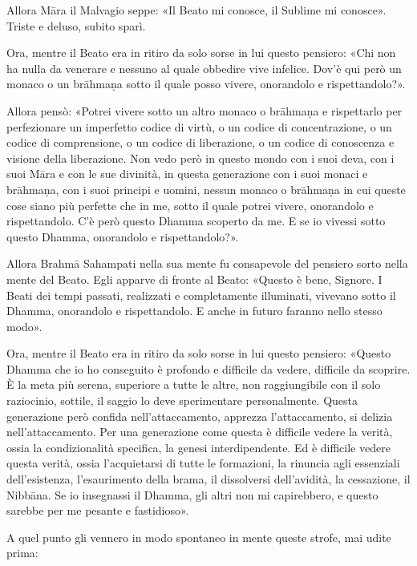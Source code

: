 Allora Māra il Malvagio seppe: «Il Beato mi conosce, il Sublime mi conosce».
Triste e deluso, subito sparì.


Ora, mentre il Beato era in ritiro da solo sorse in lui questo pensiero: «Chi
non ha nulla da venerare e nessuno al quale obbedire vive infelice. Dov’è qui
però un monaco o un brāhmaṇa sotto il quale posso vivere, onorandolo e
rispettandolo?».

Allora pensò: «Potrei vivere sotto un altro monaco o brāhmaṇa e rispettarlo per
perfezionare un imperfetto codice di virtù, o un codice di concentrazione, o un
codice di comprensione, o un codice di liberazione, o un codice di conoscenza e
visione della liberazione. Non vedo però in questo mondo con i suoi deva, con i
suoi Māra e con le sue divinità, in questa generazione con i suoi monaci e
brāhmaṇa, con i suoi principi e uomini, nessun monaco o brāhmaṇa in cui queste
cose siano più perfette che in me, sotto il quale potrei vivere, onorandolo e
rispettandolo. C’è però questo Dhamma scoperto da me. E se io vivessi sotto
questo Dhamma, onorandolo e rispettandolo?».

Allora Brahmā Sahampati nella sua mente fu consapevole del pensiero sorto nella
mente del Beato. Egli apparve di fronte al Beato: «Questo è bene, Signore. I
Beati dei tempi passati, realizzati e completamente illuminati, vivevano sotto
il Dhamma, onorandolo e rispettandolo. E anche in futuro faranno nello stesso
modo».


 Ora, mentre il Beato era in ritiro da solo sorse in lui
questo pensiero: «Questo Dhamma che io ho conseguito è profondo e difficile da
vedere, difficile da scoprire. È la meta più serena, superiore a tutte le altre,
non raggiungibile con il solo raziocinio, sottile, il saggio lo deve
sperimentare personalmente. Questa generazione però confida nell’attaccamento,
apprezza l’attaccamento, si delizia nell’attaccamento. Per una generazione come
questa è difficile vedere la verità, ossia la condizionalità specifica, la
genesi interdipendente. Ed è difficile vedere questa verità, ossia l’acquietarsi
di tutte le formazioni, la rinuncia agli essenziali dell’esistenza,
l’esaurimento della brama, il dissolversi dell’avidità, la cessazione, il
Nibbāna. Se io insegnassi il Dhamma, gli altri non mi capirebbero, e questo
sarebbe per me pesante e fastidioso».

A quel punto gli vennero in modo spontaneo in mente queste strofe, mai udite
prima:

